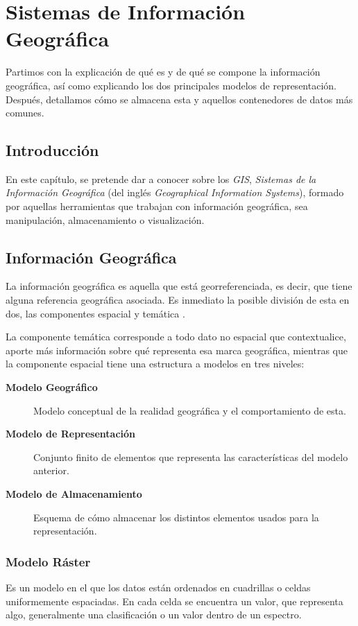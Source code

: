 \chapter{Sistemas de Información Geográfica}
\label{ch:geopackage}

\begin{chapsummary}
	Partimos con la explicación de qué es y de qué se compone la información geográfica, así como explicando los dos principales modelos de representación. Después, detallamos cómo se almacena esta y aquellos contenedores de datos más comunes.
\end{chapsummary}

\section*{Introducción} En este capítulo, se pretende dar a conocer sobre los \textit{GIS}, \textit{Sistemas de la Información Geográfica} (del inglés \textit{Geographical Information Systems}), formado por aquellas herramientas que trabajan con información geográfica, sea manipulación, almacenamiento o visualización.

\section{Información Geográfica}
	La información geográfica es aquella que está georreferenciada, es decir, que tiene alguna referencia geográfica asociada. Es inmediato la posible división de esta en dos, las componentes espacial y temática \autocite[69]{volaya}.
	
	La componente temática corresponde a todo dato no espacial que contextualice, aporte más información sobre qué representa esa marca geográfica, mientras que la componente espacial tiene una estructura a modelos en tres niveles\autocite[80]{volaya}:
	
	\begin{description}
		\item[\textbf{Modelo Geográfico}] Modelo conceptual de la realidad geográfica y el comportamiento de esta.
		\item[\textbf{Modelo de Representación}] Conjunto finito de elementos que representa las características del modelo anterior.
		\item[\textbf{Modelo de Almacenamiento}] Esquema de cómo almacenar los distintos elementos usados para la representación.
	\end{description}
	
\subsection{Modelo Ráster}
	Es un modelo en el que los datos están ordenados en cuadrillas o celdas uniformemente espaciadas. En cada celda se encuentra un valor, que representa algo, generalmente una clasificación o un valor dentro de un espectro. 
	
